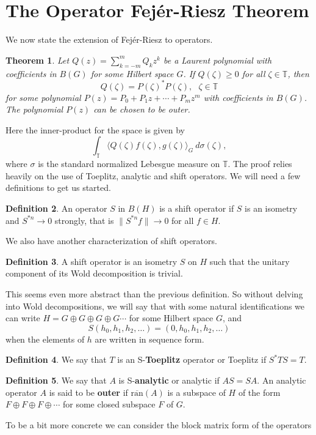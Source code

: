 \documentclass[12 pt]{article}
\theoremstyle{plain}
\newtheorem{theorem}{Theorem}[section]
\theoremstyle{definition}
\newtheorem{definition}[theorem]{Definition}
\newcommand{\ip}[2]{\langle #1, #2\rangle}
\newcommand{\ran}{\text{ran}}
\begin{document}
\section{The Operator Fej\'{e}r-Riesz Theorem}
We now state the extension of Fej\'{e}r-Riesz to operators. 
\begin{theorem}
Let $Q(z)=\sum_{k=-m}^m Q_kz^k$ be a Laurent polynomial with coefficients in $B(G)$ for some Hilbert space $G$. If $Q(\zeta)\geq 0$ for all $\zeta\in \mathbb{T}$, then 
\[Q(\zeta)=P(\zeta)^* P(\zeta), \ \ \ \zeta\in \mathbb{T}\]
for some polynomial $P(z)=P_0+P_1z+\cdots +P_mz^m$ with coefficients in $B(G)$. The polynomial $P(z)$ can be chosen to be outer. 
\end{theorem}
Here the inner-product for the space is given by
\[\int_{\mathbb{T}}\ip{Q(\zeta)f(\zeta)}{g(\zeta)}_G\ d\sigma(\zeta),\]
where $\sigma$ is the standard normalized Lebesgue measure on $\mathbb{T}$.
The proof relies heavily on the use of Toeplitz, analytic and shift operators. We will need a few definitions to get us started. 
\begin{definition}
An operator $S$ in $B(H)$ is a shift operator if $S$ is an isometry and $S^{*n}\rightarrow 0$ strongly, that is $\|S^{*n}f\|\rightarrow 0$ for all $f\in H$. 
\end{definition}
We also have another characterization of shift operators. 
\begin{definition}
A shift operator is an isometry $S$ on $H$ such that the unitary component of its Wold decomposition is trivial. 
\end{definition}
This seems even more abstract than the previous definition. So without delving into Wold decompositions, we will say that with some natural identifications we can write $H=G\oplus G\oplus G\oplus G\cdots $ for some Hilbert space $G$, and 
\[S(h_0,h_1,h_2,\ldots)=(0,h_0,h_1,h_2,\ldots)\]
when the elements of $h$ are written in sequence form.
\begin{definition}
We say that $T$ is an S-{\bf Toeplitz} operator or Toeplitz if $S^*TS=T$. 
\end{definition}
\begin{definition}
We say that $A$ is S-{\bf analytic} or analytic if $AS=SA$. An analytic operator $A$ is said to be {\bf outer} if $\overline{\ran}(A)$ is a subspace of $H$ of the form $F\oplus F\oplus F\oplus \cdots $ for some closed subspace $F$ of $G$. 
\end{definition}
To be a bit more concrete we can consider the block matrix form of the operators 
\end{document}
